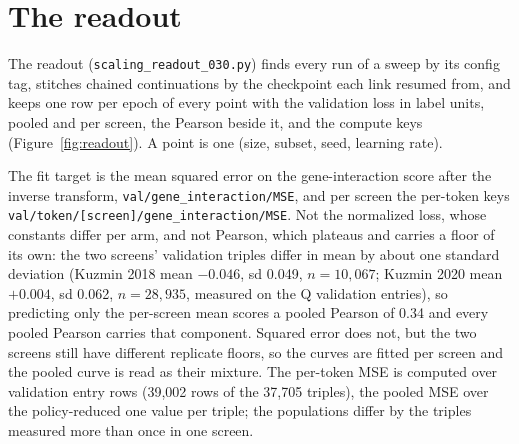 
\section{The readout}
\label{sec:readout}

The readout (\texttt{scaling\_readout\_030.py}) finds every run of a sweep by its
config tag, stitches chained continuations by the checkpoint each link resumed
from, and keeps one row per epoch of every point with the validation loss in
label units, pooled and per screen, the Pearson beside it, and the compute keys
(Figure~\ref{fig:readout}). A point is one (size, subset, seed, learning rate).


The fit target is the mean squared error on the gene-interaction score after the
inverse transform, \texttt{val/gene\_interaction/MSE}, and per screen the
per-token keys \texttt{val/token/[screen]/gene\_interaction/MSE}. Not the
normalized loss, whose constants differ per arm, and not Pearson, which plateaus
and carries a floor of its own: the two screens' validation triples differ in
mean by about one standard deviation (Kuzmin 2018 mean $-0.046$, sd 0.049,
$n = 10{,}067$; Kuzmin 2020 mean $+0.004$, sd 0.062, $n = 28{,}935$, measured on
the Q validation entries), so predicting only the per-screen mean scores a pooled
Pearson of 0.34 and every pooled Pearson carries that component. Squared error
does not, but the two screens still have different replicate floors, so the
curves are fitted per screen and the pooled curve is read as their mixture. The
per-token MSE is computed over validation entry rows (39,002 rows of the 37,705
triples), the pooled MSE over the policy-reduced one value per triple; the
populations differ by the triples measured more than once in one screen.

